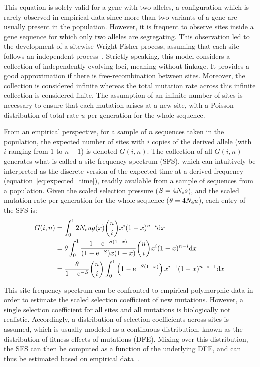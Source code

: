 This equation is solely valid for a gene with two \glspl{allele}, a configuration which is rarely observed in empirical data since more than two variants of a gene are usually present in the population.
However, it is frequent to observe sites inside a gene sequence for which only two \glspl{allele} are segregating.
This observation led to the development of a sitewise Wright-Fisher process, assuming that each site follows an independent process~\citep{Sawyer1992}.
Strictly speaking, this model considers a collection of independently evolving loci, meaning without linkage.
It provides a good approximation if there is free-recombination between sites.
Moreover, the collection is considered infinite whereas the total mutation rate across this infinite collection is considered finite.
The assumption of an infinite number of sites is necessary to ensure that each mutation arises at a new site, with a Poisson distribution of total rate $u$ per generation for the whole sequence.

From an empirical perspective, for a sample of $n$ sequences taken in the population, the expected number of sites with $i$ copies of the derived allele (with $i$ ranging from $1$ to $n - 1$) is denoted $G(i, n)$.
The collection of all $G(i, n)$ generates what is called a site frequency spectrum (\acrshort{SFS}), which can intuitively be interpreted as the discrete version of the expected time at a derived frequency (equation~\ref{eq:expected_time}), readily available from a sample of sequences from a population.
Given the scaled selection pressure ($S=4 N_{\textrm{e}} s$), and the scaled mutation rate per generation for the whole sequence ($\theta = 4 N_{\textrm{e}} u $), each entry of the \acrshort{SFS} is:
\begin{align}
    G(i, n) & = \int_{0}^{1}  2 N_{\textrm{e}} u g(x) \binom{n}{i} x^{i} (1-x)^{n-i} \mathrm{d} x \\
    & = \theta \int_{0}^{1} \dfrac{1 - \mathrm{e}^{-S(1-x)}}{(1 - \mathrm{e}^{-S})x(1-x)} \binom{n}{i} x^{i} (1-x)^{n-i} \mathrm{d} x \\
    & =  \dfrac{\theta }{1 - \mathrm{e}^{-S}} \binom{n}{i} \int_{0}^{1} \left( 1 - \mathrm{e}^{-S(1-x)} \right) x^{i-1} (1-x)^{n-i-1} \mathrm{d} x
\end{align}

This site frequency spectrum can be confronted to empirical \gls{polymorphic} data in order to estimate the scaled selection coefficient of new mutations.
However, a single selection coefficient for all sites and all mutations is biologically not realistic.
Accordingly, a distribution of selection coefficients across sites is assumed, which is usually modeled as a continuous distribution, known as the distribution of fitness effects of mutations (DFE).
Mixing over this distribution, the SFS can then be computed as a function of the underlying DFE, and can thus be estimated based on empirical data~\citep{eyre-walker_distribution_2006, eyre-walker_estimating_2009}.


